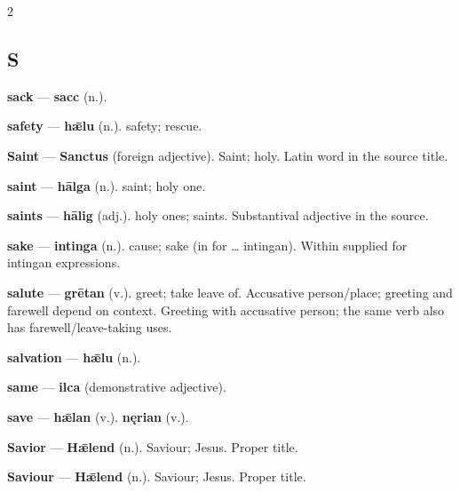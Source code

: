 \begin{multicols}{2}
\subsection*{S}
\textbf{sack} — \textbf{sacc} (n.).\par
\textbf{safety} — \textbf{hǣlu} (n.). safety; rescue.\par
\textbf{Saint} — \textbf{Sanctus} (foreign adjective). Saint; holy. Latin word in the source title.\par
\textbf{saint} — \textbf{hālga} (n.). saint; holy one.\par
\textbf{saints} — \textbf{hālig} (adj.). holy ones; saints. Substantival adjective in the source.\par
\textbf{sake} — \textbf{intinga} (n.). cause; sake (in for … intingan). Within supplied for intingan expressions.\par
\textbf{salute} — \textbf{grētan} (v.). greet; take leave of. Accusative person/place; greeting and farewell depend on context. Greeting with accusative person; the same verb also has farewell/leave-taking uses.\par
\textbf{salvation} — \textbf{hǣlu} (n.).\par
\textbf{same} — \textbf{ilca} (demonstrative adjective).\par
\textbf{save} — \textbf{hǣlan} (v.).  \textbf{nęrian} (v.).\par
\textbf{Savior} — \textbf{Hǣlend} (n.). Saviour; Jesus. Proper title.\par
\textbf{Saviour} — \textbf{Hǣlend} (n.). Saviour; Jesus. Proper title.\par

\end{multicols}
